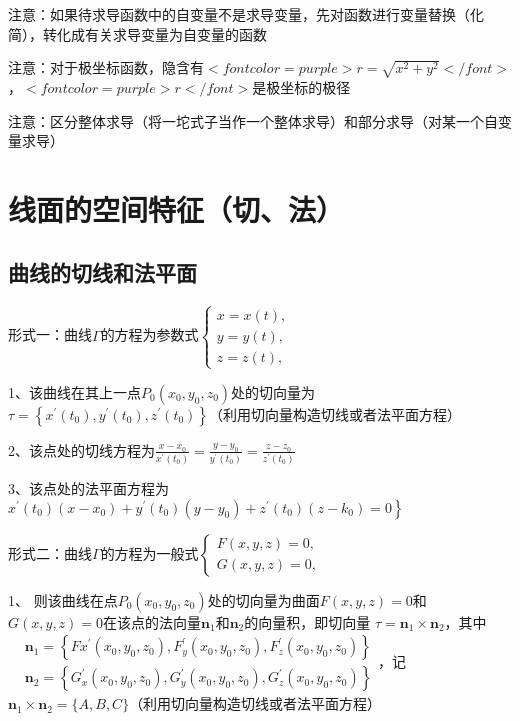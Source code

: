 注意：如果待求导函数中的自变量不是求导变量，先对函数进行变量替换（化简），转化成有关求导变量为自变量的函数

注意：对于极坐标函数，隐含有$ <font color=purple>r=\sqrt{x^2+y^2}</font> $，$ <font color=purple>r</font> $是极坐标的极径

注意：区分整体求导（将一坨式子当作一个整体求导）和部分求导（对某一个自变量求导）

\section{线面的空间特征（切、法）}



\subsection{曲线的切线和法平面}

形式一：曲线$ \Gamma $的方程为参数式$ \left\{\begin{array}{l}x=x(t), \\ y=y(t),  \\ z=z(t),\end{array}\right. $

1、该曲线在其上一点$ P_{0}\left(x_{0}, y_{0}, z_{0}\right) $处的切向量为$ \tau=\left\{x^{\prime}\left(t_{0}\right), y^{\prime}\left(t_{0}\right), z^{\prime}\left(t_{0}\right)\right\} $（利用切向量构造切线或者法平面方程）

2、该点处的切线方程为$ \frac{x-x_{0}}{x^{\prime}\left(t_{0}\right)}=\frac{y-y_{0}}{y^{\prime}\left(t_{0}\right)}=\frac{z-z_{0}}{z^{\prime}\left(t_{0}\right)} $

3、该点处的法平面方程为$ \left.x^{\prime}\left(t_{0}\right)\left(x-x_{0}\right)+y^{\prime}\left(t_{0}\right)\left(y-y_{0}\right)+z^{\prime}\left(t_{0}\right)\left(z-k_{0}\right) = 0\right\} $

形式二：曲线$ \Gamma $的方程为一般式$ \left\{\begin{array}{l}F(x, y, z)=0,\\ G(x, y, z)=0,\end{array}\right. $

1、 则该曲线在点$ P_{0}\left(x_{0}, y_{0}, z_{0}\right) $处的切向量为曲面$ F(x, y, z)=0 $和$ G(x, y, z)=0 $在该点的法向量$ \boldsymbol{n}_{1} $和$ \boldsymbol{n}_{2} $的向量积，即切向量 $ \tau=\boldsymbol{n}_{1} \times \boldsymbol{n}_{2} $，其中$ \begin{aligned} &\boldsymbol{n}_{1}=\left\{F{x}^{\prime}\left(x_{0}, y_{0}, z_{0}\right), F_{y}^{\prime}\left(x_{0}, y_{0}, z_{0}\right), F_{z}^{\prime}\left(x_{0}, y_{0}, z_{0}\right)\right\} \\ &\boldsymbol{n}_{2}=\left\{G_{x}^{\prime}\left(x_{0}, y_{0}, z_{0}\right), G_{y}^{\prime}\left(x_{0}, y_{0}, z_{0}\right), G_{z}^{\prime}\left(x_{0}, y_{0}, z_{0}\right)\right\} \end{aligned} $，记$ \boldsymbol{n}_{1} \times \boldsymbol{n}_{2}=\{A, B, C\} $（利用切向量构造切线或者法平面方程）

